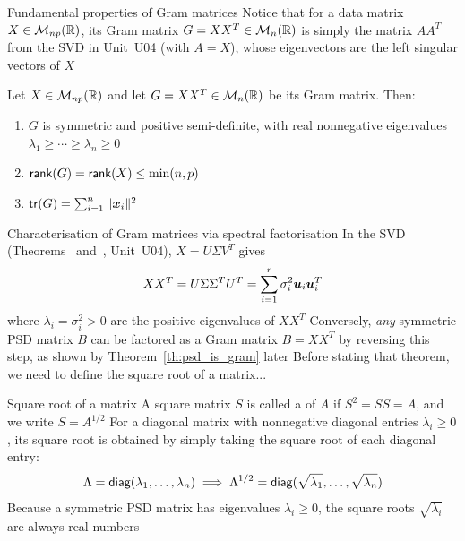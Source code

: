 \documentclass[aspectratio=169]{beamer}\usepackage[]{graphicx}\usepackage[]{xcolor}
\begin{document}
\begin{frame}{Fundamental properties of Gram matrices}
Notice that for a data matrix $X\in\mathcal{M}_{np}(\mathbb{R})$, its Gram matrix $G = XX^T\in\mathcal{M}_n(\mathbb{R})$ is simply the matrix $AA^T$ from the SVD in Unit~U04 (with $A = X$), whose eigenvectors are the left singular vectors of $X$
\vfill
\begin{theorem}
\label{th:gram_properties}
Let $X\in\mathcal{M}_{np}(\mathbb{R})$ and let $G = XX^T\in\mathcal{M}_n(\mathbb{R})$ be its Gram matrix. Then:
\begin{enumerate}
\item $G$ is symmetric and positive semi-definite, with real nonnegative eigenvalues $\lambda_1 \ge \cdots \ge \lambda_n \ge 0$
\item $\mathsf{rank}(G) = \mathsf{rank}(X) \le \min(n,p)$
\item $\mathsf{tr}(G) = \sum_{i=1}^n \|\bm{x}_i\|^2$
\end{enumerate}
\end{theorem}
\end{frame}

\begin{frame}{Characterisation of Gram matrices via spectral factorisation}
In the SVD (Theorems~ and~, Unit~U04), $X = U\Sigma V^T$ gives 
\[
XX^T = U\Sigma\Sigma^T U^T = \sum_{i=1}^r \sigma_i^2 \bm{u}_i\bm{u}_i^T
\]
where $\lambda_i = \sigma_i^2 > 0$ are the positive eigenvalues of $XX^T$
\vfill
Conversely, \emph{any} symmetric PSD matrix $B$ can be factored as a Gram matrix $B = XX^T$ by reversing this step, as shown by Theorem~\ref{th:psd_is_gram} later
\vfill
Before stating that theorem, we need to define the square root of a matrix...
\end{frame}

\begin{frame}{Square root of a matrix}
A square matrix $S$ is called a  of $A$ if $S^2 = SS = A$, and we write $S = A^{1/2}$
\vfill
For a diagonal matrix with nonnegative diagonal entries $\lambda_i \ge 0$, its square root is obtained by simply taking the square root of each diagonal entry:
\[
\Lambda = \mathsf{diag}(\lambda_1,\ldots,\lambda_n)
\implies
\Lambda^{1/2} = \mathsf{diag}(\sqrt{\lambda_1},\ldots,\sqrt{\lambda_n})
\]
\vfill
Because a symmetric PSD matrix has eigenvalues $\lambda_i \ge 0$, the square roots $\sqrt{\lambda_i}$ are always real numbers
\end{frame}
\end{document}
